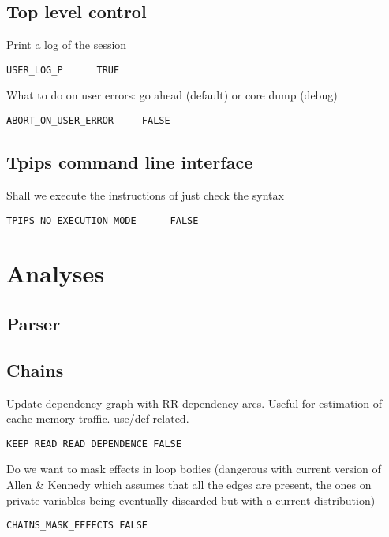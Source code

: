\subsection{Top level control}

Print a log of the session

\begin{verbatim}
USER_LOG_P      TRUE
\end{verbatim}

What to do on user errors: go ahead (default) or core dump (debug)

\begin{verbatim}
ABORT_ON_USER_ERROR     FALSE
\end{verbatim}

\subsection{Tpips command line interface}

Shall we execute the instructions of just check the syntax

\begin{verbatim}
TPIPS_NO_EXECUTION_MODE      FALSE
\end{verbatim}

\section{Analyses}
\label{section-analyses}

\subsection{Parser}

\subsection{Chains}

Update dependency graph with RR dependency arcs.
Useful for estimation of cache memory traffic. use/def related.

\begin{verbatim}
KEEP_READ_READ_DEPENDENCE FALSE
\end{verbatim}

Do we want to mask effects in loop bodies (dangerous with current
version of Allen \& Kennedy which assumes that all the edges are
present, the ones on private variables being eventually discarded
but with a current distribution)

\begin{verbatim}
CHAINS_MASK_EFFECTS FALSE
\end{verbatim}

